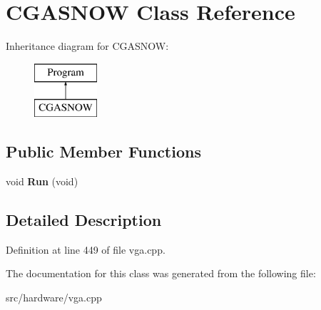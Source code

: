 \hypertarget{classCGASNOW}{\section{C\-G\-A\-S\-N\-O\-W Class Reference}
\label{classCGASNOW}
}
Inheritance diagram for C\-G\-A\-S\-N\-O\-W\-:\begin{figure}[H]
\begin{center}
\leavevmode
\includegraphics[height=2.000000cm]{classCGASNOW}
\end{center}
\end{figure}
\subsection*{Public Member Functions}
\begin{DoxyCompactItemize}
\item 
\hypertarget{classCGASNOW_a756619df2231c00d48df4bfec4a8965b}{void {\bfseries Run} (void)}\label{classCGASNOW_a756619df2231c00d48df4bfec4a8965b}

\end{DoxyCompactItemize}


\subsection{Detailed Description}


Definition at line 449 of file vga.\-cpp.



The documentation for this class was generated from the following file\-:\begin{DoxyCompactItemize}
\item 
src/hardware/vga.\-cpp\end{DoxyCompactItemize}
